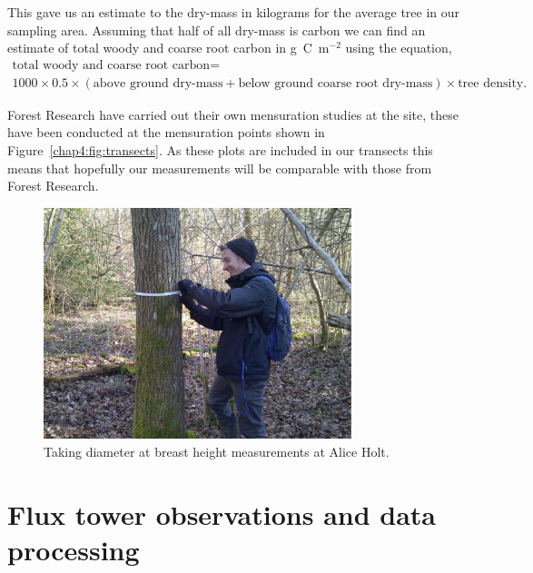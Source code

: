 This gave us an estimate to the dry-mass in kilograms for the average tree in our sampling area. Assuming that half of all dry-mass is carbon we can find an estimate of total woody and coarse root carbon in g~C~m\(^{-2}\) using the equation,
\begin{multline}
\text{total woody and coarse root carbon} =  \\1000\times0.5\times(\text{above ground dry-mass} + \text{below ground coarse root dry-mass})\times \text{tree density}.
\end{multline}

Forest Research have carried out their own mensuration studies at the site, these have been conducted at the mensuration points shown in Figure~\ref{chap4:fig:transects}. As these plots are included in our transects this means that hopefully our measurements will be comparable with those from Forest Research.  

\begin{figure}[ht]
    \centering
    \includegraphics[width=0.8\textwidth]{chapter/chapter4/dbh_me.pdf}
    \caption{Taking diameter at breast height measurements at Alice Holt.} \label{chap4:fig:dbh_me}
\end{figure}

\section{Flux tower observations and data processing}

